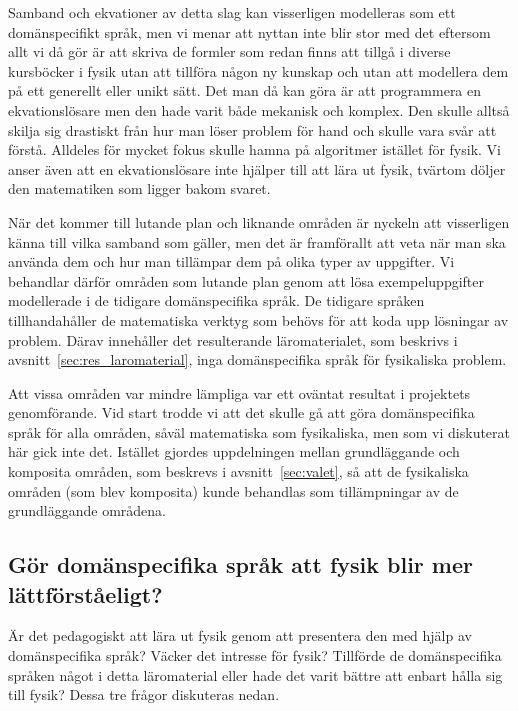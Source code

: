 Samband och ekvationer av detta slag kan visserligen modelleras som ett domänspecifikt
språk, men vi menar att nyttan inte blir stor med det eftersom allt vi då gör är
att skriva de formler som redan finns att tillgå i diverse kursböcker i fysik
utan att tillföra någon ny kunskap och utan att modellera dem på ett generellt
eller unikt sätt. Det man då kan göra är att programmera en ekvationslösare men
den hade varit både mekanisk och komplex. Den skulle alltså skilja sig
drastiskt från hur man löser problem för hand och skulle vara svår att förstå.
Alldeles för mycket fokus skulle hamna på algoritmer istället för fysik. Vi
anser även att en ekvationslösare inte hjälper till att lära ut fysik, tvärtom
döljer den matematiken som ligger bakom svaret.

När det kommer till lutande plan och liknande områden är nyckeln att visserligen
känna till vilka samband som gäller, men det är framförallt att veta när man ska
använda dem och hur man tillämpar dem på olika typer av uppgifter. Vi behandlar
därför områden som lutande plan genom att lösa exempeluppgifter modellerade i de
tidigare domänspecifika språk. De tidigare språken tillhandahåller de matematiska
verktyg som behövs för att koda upp lösningar av problem. Därav innehåller det
resulterande läromaterialet, som beskrivs i avsnitt~\ref{sec:res_laromaterial},
inga domänspecifika språk för fysikaliska problem.

Att vissa områden var mindre lämpliga var ett oväntat resultat i projektets
genomförande. Vid start trodde vi att det skulle gå att göra domänspecifika
språk för alla områden, såväl matematiska som fysikaliska, men som vi
diskuterat här gick inte det. Istället gjordes uppdelningen mellan grundläggande och
komposita områden, som beskrevs i avsnitt~\ref{sec:valet}, så att de fysikaliska
områden (som blev komposita) kunde behandlas som tillämpningar av de
grundläggande områdena.

\subsection{Gör domänspecifika språk att fysik blir mer lättförståeligt?}\label{sec:bara_fysik}

Är det pedagogiskt att lära ut fysik genom att presentera den med hjälp av
domänspecifika språk? Väcker det intresse för fysik? Tillförde de domänspecifika
språken något i detta läromaterial eller hade det varit bättre att enbart hålla
sig till fysik? Dessa tre frågor diskuteras nedan.

